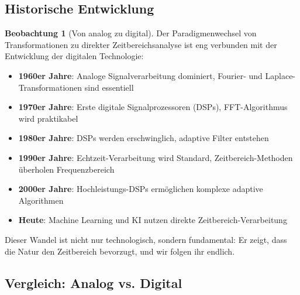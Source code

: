 ﻿\documentclass[a4paper,12pt]{report}
\theoremstyle{definition}
\newtheorem{beobachtung}{Beobachtung}
\begin{document}
	\subsection{Historische Entwicklung}
	
	\begin{beobachtung}[Von analog zu digital]
		Der Paradigmenwechsel von Transformationen zu direkter Zeitbereichsanalyse ist eng verbunden mit der Entwicklung der digitalen Technologie:
		
		\begin{itemize}
			\item[-] \textbf{1960er Jahre}: Analoge Signalverarbeitung dominiert, Fourier- und Laplace-Transfor\-mationen sind essentiell
			\item[-] \textbf{1970er Jahre}: Erste digitale Signalprozessoren (DSPs), FFT-Algorithmus wird praktikabel
			\item[-] \textbf{1980er Jahre}: DSPs werden erschwinglich, adaptive Filter entstehen
			\item[-] \textbf{1990er Jahre}: Echtzeit-Verarbeitung wird Standard, Zeitbereich-Methoden überholen Frequenzbereich
			\item[-] \textbf{2000er Jahre}: Hochleistungs-DSPs ermöglichen komplexe adaptive Algorithmen
			\item[-] \textbf{Heute}: Machine Learning und KI nutzen direkte Zeitbereich-Verarbeitung
		\end{itemize}
		
		Dieser Wandel ist nicht nur technologisch, sondern fundamental: Er zeigt, dass die Natur den Zeitbereich bevorzugt, und wir folgen ihr endlich.
	\end{beobachtung}
	
	\subsection{Vergleich: Analog vs. Digital}
	
\end{document}
